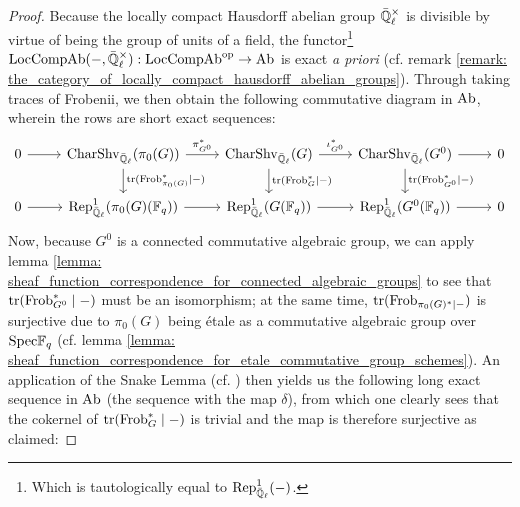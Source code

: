                 \begin{proof}
                    Because the locally compact Hausdorff abelian group $\bar{\Q}_{\ell}^{\x}$ is divisible by virtue of being the group of units of a field, the functor\footnote{Which is tautologically equal to $\mathrm{Rep}^1_{\bar{\mathbb{Q}}_{\ell}}(-)$.} $\Loc\Comp\Ab(-, \bar{\Q}_{\ell}^{\x}): \Loc\Comp\Ab^{\op} \to \Ab$ is exact \textit{a priori} (cf. remark \ref{remark: the_category_of_locally_compact_hausdorff_abelian_groups}). Through taking traces of Frobenii, we then obtain the following commutative diagram in $\mathrm{Ab}$, wherein the rows are short exact sequences:
                        $$
                            \begin{tikzcd}
                            	0 & {\Char\Shv_{\bar{\Q}_{\ell}}(\pi_0(G))} & {\Char\Shv_{\bar{\Q}_{\ell}}(G)} & {\Char\Shv_{\bar{\Q}_{\ell}}(G^0)} & 0 \\
                            	0 & {\Rep^1_{\bar{\Q}_{\ell}}(\pi_0(G)(\F_q))} & {\Rep^1_{\bar{\Q}_{\ell}}(G(\F_q))} & {\Rep^1_{\bar{\Q}_{\ell}}(G^0(\F_q))} & 0
                            	\arrow[from=1-1, to=1-2]
                            	\arrow["{\pi_{G^0}^*}", from=1-2, to=1-3]
                            	\arrow["{\iota_{G^0}^*}", from=1-3, to=1-4]
                            	\arrow[from=1-4, to=1-5]
                            	\arrow[from=2-1, to=2-2]
                            	\arrow[from=2-2, to=2-3]
                            	\arrow[from=2-3, to=2-4]
                            	\arrow[from=2-4, to=2-5]
                            	\arrow["{\trace(\Frob_{\pi_0(G)}^* \mid -)}", from=1-2, to=2-2]
                            	\arrow["{\trace(\Frob_G^* \mid -)}", from=1-3, to=2-3]
                            	\arrow["{\trace(\Frob_{G^0}^* \mid -)}", from=1-4, to=2-4]
                            \end{tikzcd}
                        $$
                    Now, because $G^0$ is a connected commutative algebraic group, we can apply lemma \ref{lemma: sheaf_function_correspondence_for_connected_algebraic_groups} to see that $\operatorname{tr}(\mathrm{Frob}_{G^0}^* \mid -)$ must be an isomorphism; at the same time, $\operatorname{tr}(\mathrm{Frob}_{\pi_0(G)^* \mid -})$ is surjective due to $\pi_0(G)$ being \'etale as a commutative algebraic group over $\mathrm{Spec} \mathbb{F}_q$ (cf. lemma \ref{lemma: sheaf_function_correspondence_for_etale_commutative_group_schemes}). An application of the Snake Lemma (cf. \cite[\href{https://stacks.math.columbia.edu/tag/07JV}{Tag 07JV}]{stacks}) then yields us the following long exact sequence in $\mathrm{Ab}$ (the sequence with the map $\delta$), from which one clearly sees that the cokernel of $\operatorname{tr}(\mathrm{Frob}_G^* \mid -)$ is trivial and the map is therefore surjective as claimed:

\end{proof}
